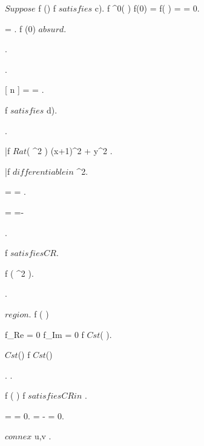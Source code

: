 \documentclass[../Main/main]{subfiles}
\begin{document}
{{{			
			{
				$ Suppose $ \exists \; f \in \Hc(\D) \suchthat f $ satisfies $ c).
				f \in \Cc^0( \D ) \imp f(0) = f(  ) =  = 0.

				 =  \nin \C.
				f \nin \Hc(0) $ absurd $.
			}.

			{
				.

				{
					 =  = 
				}.

				f $ satisfies $ d).


				.

				\bar{f} \in $ Rat$( \R^2 ) \logicAnd {}
				{
					(x+1)^2 + y^2 
				}.

				\bar{f} $ differentiable in $ \R^2.

				{
					 =  = .

					 = =-
				}.				

				f $ satisfies CR $.

				\conclude f \in \Hc( \R^2 ).

			}.
		}
	}


	{
		{
			\Omega \subset \C $ region $.
			f \in \Hc( \Omega )
		}
		\holds
		{
			f_{Re} = 0 \logicOr f_{Im} = 0 \imp f \in $ Cst$( \Omega ).

			 \in $ Cst$(\Omega) \imp f \in $ Cst$(\Omega)

		}
		\demonstration
		{
			{
				.
				.

				f \in \Hc( \Omega ) \imp f $ satisfies CR in $ \Omega.

				 =   = 0.
				 = - = 0.

				{
					\Omega $ connex $ \imp u,v \in \constant{ \Omega }.
				}

}}}}
\end{document}
